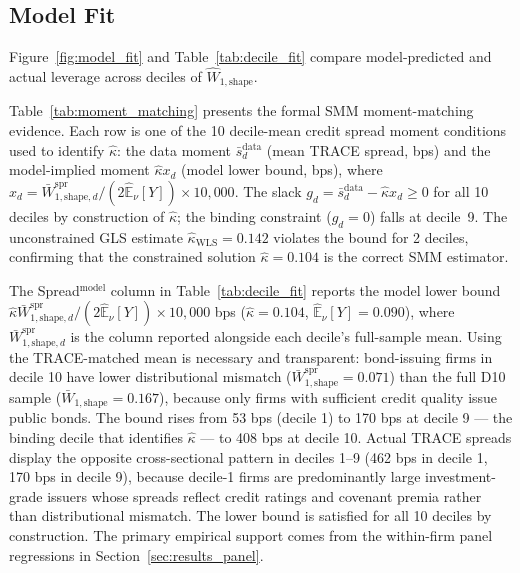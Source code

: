 \subsection{Model Fit}
\label{sec:results_fit}

Figure~\ref{fig:model_fit} and Table~\ref{tab:decile_fit} compare model-predicted and actual leverage across deciles of $\widehat{W}_{1,\text{shape}}$.



Table~\ref{tab:moment_matching} presents the formal SMM moment-matching evidence. Each row is one of the 10 decile-mean credit spread moment conditions used to identify $\hat{\kappa}$: the data moment $\bar{s}_d^{\text{data}}$ (mean TRACE spread, bps) and the model-implied moment $\hat{\kappa} x_d$ (model lower bound, bps), where $x_d = \bar{W}_{1,\text{shape},d}^{\text{spr}}/(2\hat{\mathbb{E}}_\nu[Y])\times 10{,}000$. The slack $g_d = \bar{s}_d^{\text{data}} - \hat{\kappa} x_d \geq 0$ for all 10 deciles by construction of $\hat{\kappa}$; the binding constraint ($g_d = 0$) falls at decile~9. The unconstrained GLS estimate $\hat{\kappa}_{\text{WLS}} = 0.142$ violates the bound for 2 deciles, confirming that the constrained solution $\hat{\kappa} = 0.104$ is the correct SMM estimator.



The Spread$^{\text{model}}$ column in Table~\ref{tab:decile_fit} reports the model lower bound $\hat{\kappa}\bar{W}_{1,\text{shape},d}^{\text{spr}}/(2\hat{\mathbb{E}}_\nu[Y]) \times 10{,}000$ bps ($\hat{\kappa}=0.104$, $\hat{\mathbb{E}}_\nu[Y]=0.090$), where $\bar{W}_{1,\text{shape},d}^{\text{spr}}$ is the column reported alongside each decile's full-sample mean. Using the TRACE-matched mean is necessary and transparent: bond-issuing firms in decile 10 have lower distributional mismatch ($\bar{W}_{1,\text{shape}}^{\text{spr}} = 0.071$) than the full D10 sample ($\bar{W}_{1,\text{shape}} = 0.167$), because only firms with sufficient credit quality issue public bonds. The bound rises from 53 bps (decile 1) to 170 bps at decile 9 — the binding decile that identifies $\hat{\kappa}$ — to 408 bps at decile 10. Actual TRACE spreads display the opposite cross-sectional pattern in deciles 1--9 (462 bps in decile 1, 170 bps in decile 9), because decile-1 firms are predominantly large investment-grade issuers whose spreads reflect credit ratings and covenant premia rather than distributional mismatch. The lower bound is satisfied for all 10 deciles by construction. The primary empirical support comes from the within-firm panel regressions in Section~\ref{sec:results_panel}.

